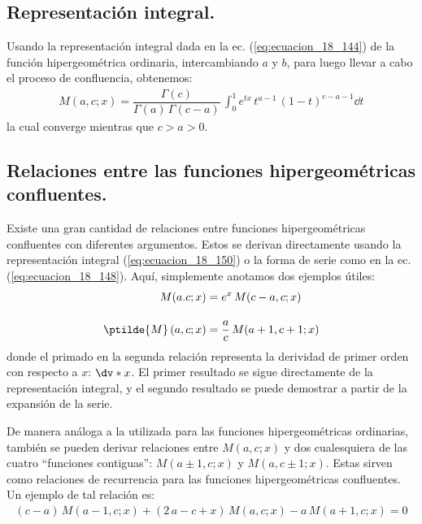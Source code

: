 \subsection{Representación integral.}

Usando la representación integral dada en la ec. (\ref{eq:ecuacion_18_144}) de la función hipergeométrica ordinaria, intercambiando $a$ y $b$, para luego llevar a cabo el proceso de confluencia, obtenemos:
\begin{align}
M(a, c; x) = \dfrac{\Gamma(c)}{\Gamma(a) \, \Gamma(c - a)} \, \int_{0}^{1} e^{t x} \, t^{a - 1} \, (1 - t)^{c-a-1} \dd{t}
\label{eq:ecuacion_18_150}
\end{align}
la cual converge mientras que $c > a > 0$.

\subsection{Relaciones entre las funciones hipergeométricas confluentes.}

Existe una gran cantidad de relaciones entre funciones hipergeométricas confluentes con diferentes argumentos. Estos se derivan directamente usando la representación integral (\ref{eq:ecuacion_18_150}) o la forma de serie como en la ec. (\ref{eq:ecuacion_18_148}). Aquí, simplemente anotamos dos ejemplos útiles:
\begin{align}
M(a. c; x) &= e^{x} \, M(c - a, c; x) \label{eq:ecuacion_18_151} \\[1em]
\ptilde{M} \, (a, c; x) &= \dfrac{a}{c} \, M(a + 1, c + 1; x) \label{eq:ecuacion_18_152}
\end{align}
donde el primado en la segunda relación representa la derividad de primer orden con respecto a $x$: $\dv*{x}$. El primer resultado se sigue directamente de la representación integral, y el segundo resultado se puede demostrar a partir de la expansión de la serie.
\par
De manera análoga a la utilizada para las funciones hipergeométricas ordinarias, también se pueden derivar relaciones entre $M (a, c; x)$ y dos cualesquiera de las cuatro \enquote{funciones contiguas}: $M (a \pm 1, c; x)$ y $M (a, c \pm 1; x)$. Estas sirven como relaciones de recurrencia para las funciones hipergeométricas confluentes. Un ejemplo de tal relación es:
\begin{align}
(c - a) \, M(a - 1, c; x) + (2 \, a - c + x) \, M(a, c; x) - a \, M(a + 1, c; x) = 0
\end{align}

